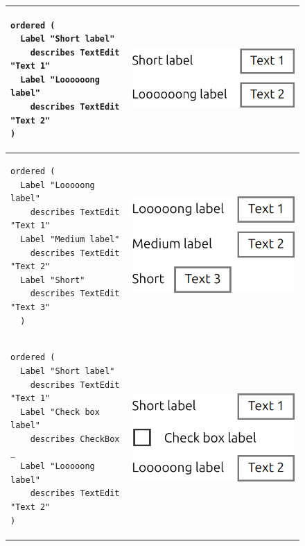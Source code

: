 \begin{figure}
	\centering
    \begin{tabular}{m{85mm}m{6cm}}
      \begin{lstlisting}[basicstyle=\small]
ordered (
  Label "Short label"
    describes TextEdit "Text 1"
  Label "Loooooong label"
    describes TextEdit "Text 2"
)
      \end{lstlisting} &
      \includegraphics[scale=0.4]{Example1-Qt-QML.png} \\
      \hline
      \begin{lstlisting}[basicstyle=\small]
ordered (
  Label "Looooong label"
    describes TextEdit "Text 1"
  Label "Medium label"
    describes TextEdit "Text 2"
  Label "Short"
    describes TextEdit "Text 3"
  )
      \end{lstlisting} &
      \includegraphics[scale=0.4]{Example2-Qt-QML.png} \\
      \hline
      \begin{lstlisting}[basicstyle=\small]
ordered (
  Label "Short label"
    describes TextEdit "Text 1"
  Label "Check box label"
    describes CheckBox _
  Label "Looooong label"
    describes TextEdit "Text 2"
)
      \end{lstlisting} &
      \vspace{1em}\includegraphics[scale=0.4]{Example4-Qt-QML.png} \\

\end{tabular}
\end{figure}
